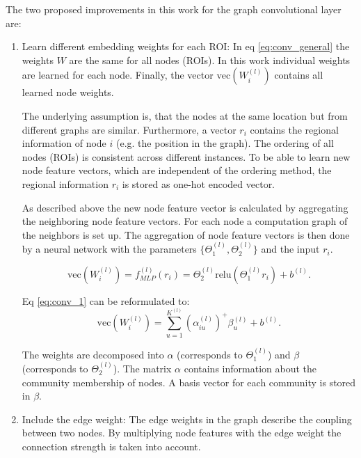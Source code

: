 The two proposed improvements in this work \cite{LI2021102233} for the graph convolutional layer are: 
\begin{enumerate}
	\item Learn different embedding weights for each ROI: \newline
	In eq \ref{eq:conv_general} the weights $W$ are the same for all nodes (ROIs). In this work individual weights are learned for each node. Finally, the vector $\textrm{vec}(W_i^{(l)})$ contains all learned node weights.
	
	The underlying assumption is, that the nodes at the same location but from different graphs are similar. Furthermore, a vector $r_i$ contains the regional information of node $i$ (e.g. the position in the graph). 
	The ordering of all nodes (ROIs) is consistent across different instances. To be able to learn new node feature vectors, which are independent of the ordering method, the regional information $r_i$ is stored as one-hot encoded vector.
	
	As described above the new node feature vector is calculated by ag\-gre\-ga\-ting the neighboring node feature vectors.
	For each node a computation graph of the neighbors is set up. The aggregation of node feature vectors is then done by a neural network with the parameters $\{\Theta_1^{(l)}, \Theta_2^{(l)}\}$ and the input $r_i$.
	
	\begin{equation}\label{eq:conv_1}
	\textrm{vec}(W_i^{(l)}) = f_{MLP}^{(l)}(r_i) = \Theta_2^{(l)} \textrm{relu}(\Theta_1^{(l)} r_i) + b^{(l)}.
	\end{equation}
	
	Eq \ref{eq:conv_1} can be reformulated to:
	\begin{equation}\label{eq:conv_2}
	\textrm{vec}(W_i^{(l)}) = \sum_{u=1}^{K^{(l)}} (\alpha_{iu}^{(l)})^+ \beta_u^{(l)} + b^{(l)}.
	\end{equation}
	
	The weights are decomposed into $\alpha$ (corresponds to $\Theta_1^{(l)}$) and $\beta$ (cor\-re\-sponds to $\Theta_2^{(l)}$). The matrix $\alpha$ contains information about the community membership of nodes. A basis vector for each community is stored in $\beta$.
	
	
	\item Include the edge weight: \newline
	The edge weights in the graph describe the coupling between two nodes. By multiplying node features with the edge weight the connection strength is taken into account.
\end{enumerate}



